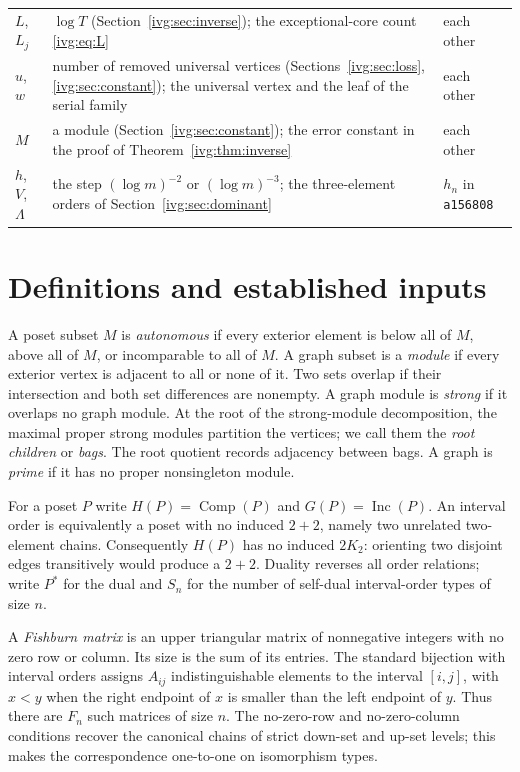 \documentclass[11pt,letterpaper]{article}
\theoremstyle{definition}\newtheorem{definition}[theorem]{Definition}
\theoremstyle{remark}\newtheorem{remark}[theorem]{Remark}
\newcommand{\Inc}{\operatorname{Inc}}
\newcommand{\Comp}{\operatorname{Comp}}
\newcommand{\file}[1]{\nolinkurl{#1}}
\begin{document}
\begin{minipage}{\textwidth}
\begin{tabular}{@{}>{\raggedright\arraybackslash}p{0.85in}>{\raggedright\arraybackslash}p{3.35in}>{\raggedright\arraybackslash}p{1.95in}@{}}
$L$, $L_j$ & $\log T$ (Section~\ref{ivg:sec:inverse}); the exceptional-core
 count \eqref{ivg:eq:L} & each other\\
$u$, $w$ & number of removed universal vertices
 (Sections~\ref{ivg:sec:loss}, \ref{ivg:sec:constant}); the universal vertex
 and the leaf of the serial family & each other\\
$M$ & a module (Section~\ref{ivg:sec:constant}); the error constant in the
 proof of Theorem~\ref{ivg:thm:inverse} & each other\\
$h$, $V$, $\Lambda$ & the step $(\log m)^{-2}$ or $(\log m)^{-3}$; the
 three-element orders of Section~\ref{ivg:sec:dominant} & $h_n$ in
 \file{a156808}\\
\bottomrule
\end{tabular}
\endgroup
\end{minipage}

\section{Definitions and established inputs}\label{ivg:sec:inputs}
A poset subset $M$ is \emph{autonomous} if every exterior element is below all of $M$, above all of $M$, or incomparable to all of $M$. A graph subset is a \emph{module} if every exterior vertex is adjacent to all or none of it. Two sets overlap if their intersection and both set differences are nonempty. A graph module is \emph{strong} if it overlaps no graph module. At the root of the strong-module decomposition, the maximal proper strong modules partition the vertices; we call them the \emph{root children} or \emph{bags}. The root quotient records adjacency between bags. A graph is \emph{prime} if it has no proper nonsingleton module.

For a poset $P$ write $H(P)=\Comp(P)$ and $G(P)=\Inc(P)$. An interval order is equivalently a poset with no induced $2+2$, namely two unrelated two-element chains. Consequently $H(P)$ has no induced $2K_2$: orienting two disjoint edges transitively would produce a $2+2$. Duality reverses all order relations; write $P^*$ for the dual and $S_n$ for the number of self-dual interval-order types of size $n$.

A \emph{Fishburn matrix} is an upper triangular matrix of nonnegative integers with no zero row or column. Its size is the sum of its entries. The standard bijection with interval orders assigns $A_{ij}$ indistinguishable elements to the interval $[i,j]$, with $x<y$ when the right endpoint of $x$ is smaller than the left endpoint of $y$. Thus there are $F_n$ such matrices of size $n$. The no-zero-row and no-zero-column conditions recover the canonical chains of strict down-set and up-set levels; this makes the correspondence one-to-one on isomorphism types.
\end{document}
